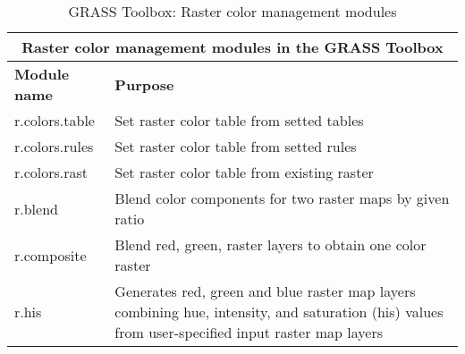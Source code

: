 \begin{table}[ht]
\centering
\caption{GRASS Toolbox: Raster color management modules}\medskip
 \begin{tabular}{|p{4cm}|p{12cm}|}
  \hline \multicolumn{2}{|c|}{\textbf{Raster color management modules in the
  GRASS Toolbox}} \\
  \hline \textbf{Module name} & \textbf{Purpose} \\
  \hline r.colors.table & Set raster color table from setted tables \\
  \hline r.colors.rules & Set raster color table from setted rules \\
  \hline r.colors.rast & Set raster color table from existing raster \\
  \hline r.blend & Blend color components for two raster maps by given ratio \\
  \hline r.composite & Blend red, green, raster layers to obtain one color
  raster \\
  \hline r.his & Generates red, green and blue raster map layers combining
  hue, intensity, and saturation (his) values from user-specified input
  raster map layers \\
\hline
\end{tabular}
\end{table}


